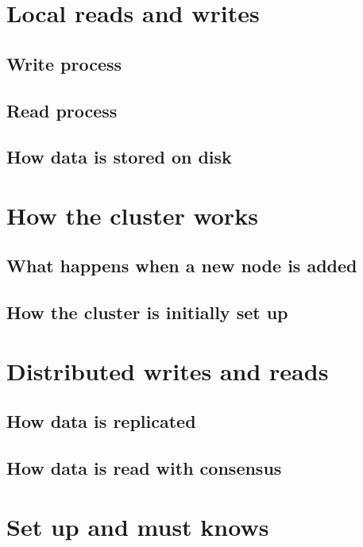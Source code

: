 \documentclass[
  10pt
]{beamer}
\begin{document}
\section{Local reads and writes}  %
\subsection{Write process}
\subsection{Read process}
\subsection{How data is stored on disk}

\section{How the cluster works}  %
\subsection{What happens when a new node is added}
\subsection{How the cluster is initially set up}

\section{Distributed writes and reads}  %
\subsection{How data is replicated}
\subsection{How data is read with consensus}

\section{Set up and must knows}  %
\end{document}
